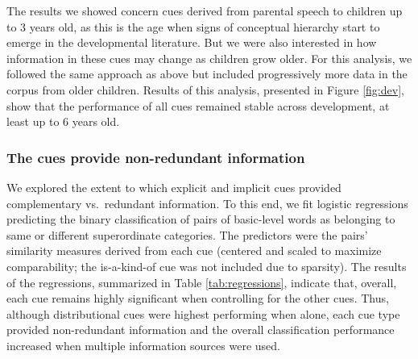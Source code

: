 \documentclass[english,,man,floatsintext]{apa6}
\begin{document}
The results we showed concern cues derived from parental speech to children up to 3
years old, as this is the age when signs of conceptual hierarchy start
to emerge in the developmental literature. But we were also interested
in how information in these cues may change as children grow older.
For this analysis, we followed the same approach as above but included progressively more data in the corpus from older children. Results of this analysis, presented in Figure \ref{fig:dev}, show that the performance of all cues
remained stable across development, at least up to 6 years old.

\hypertarget{the-cues-provide-non-redundant-information}{%
\subsubsection{The cues provide non-redundant information}\label{the-cues-provide-non-redundant-information}}

We explored the extent to which explicit and implicit cues provided
complementary vs.~redundant information. To this end, we fit logistic
regressions predicting the binary classification of pairs of basic-level
words as belonging to same or different superordinate categories. The
predictors were the pairs' similarity measures derived from each cue (centered and scaled to maximize comparability; the is-a-kind-of cue was not included due to sparsity). The results of the regressions,
summarized in Table \ref{tab:regressions}, indicate that, overall, each cue remains highly significant when controlling for the other cues. Thus, although distributional cues were highest performing when alone, each cue type provided non-redundant information and the overall classification performance increased when multiple information sources were used.
\end{document}
